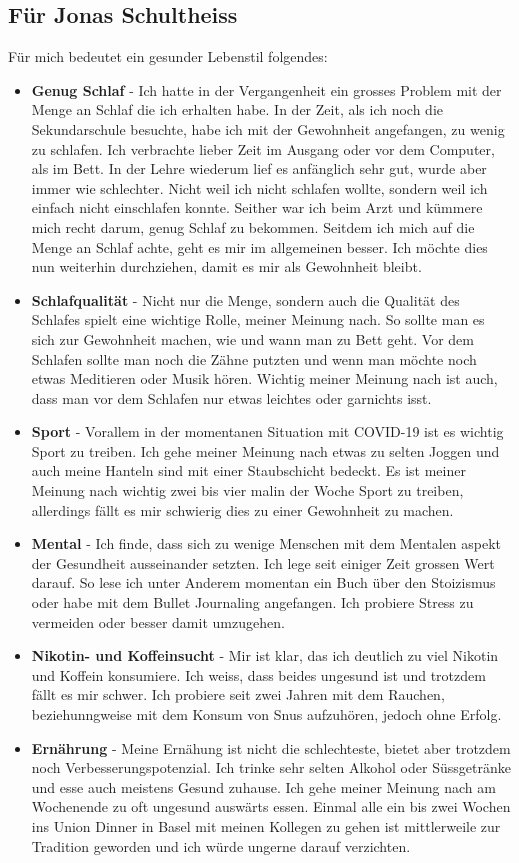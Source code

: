 \subsection{Für Jonas Schultheiss}
\authortoc{\jonas}{\subsectionident}
Für mich bedeutet ein gesunder Lebenstil folgendes:
\begin{itemize}
  \item \textbf{Genug Schlaf} - Ich hatte in der Vergangenheit ein grosses Problem mit der Menge an Schlaf die ich erhalten habe. In der Zeit, als ich noch die Sekundarschule besuchte, habe ich mit der Gewohnheit angefangen, zu wenig zu schlafen. Ich verbrachte lieber Zeit im Ausgang oder vor dem Computer, als im Bett. In der Lehre wiederum lief es anfänglich sehr gut, wurde aber immer wie schlechter. Nicht weil ich nicht schlafen wollte, sondern weil ich einfach nicht einschlafen konnte. Seither war ich beim Arzt und kümmere mich recht darum, genug Schlaf zu bekommen.
  \newline
  Seitdem ich mich auf die Menge an Schlaf achte, geht es mir im allgemeinen besser. Ich möchte dies nun weiterhin durchziehen, damit es mir als Gewohnheit bleibt.
  \item \textbf{Schlafqualität} - Nicht nur die Menge, sondern auch die Qualität des Schlafes spielt eine wichtige Rolle, meiner Meinung nach. So sollte man es sich zur Gewohnheit machen, wie und wann man zu Bett geht. Vor dem Schlafen sollte man noch die Zähne putzten und wenn man möchte noch etwas Meditieren oder Musik hören. Wichtig meiner Meinung nach ist auch, dass man vor dem Schlafen nur etwas leichtes oder garnichts isst.
  \item \textbf{Sport} - Vorallem in der momentanen Situation mit COVID-19 ist es wichtig Sport zu treiben. Ich gehe meiner Meinung nach etwas zu selten Joggen und auch meine Hanteln sind mit einer Staubschicht bedeckt. Es ist meiner Meinung nach wichtig zwei bis vier malin der Woche Sport zu treiben, allerdings fällt es mir schwierig dies zu einer Gewohnheit zu machen.
  \item \textbf{Mental} - Ich finde, dass sich zu wenige Menschen mit dem Mentalen aspekt der Gesundheit ausseinander setzten. Ich lege seit einiger Zeit grossen Wert darauf. So lese ich unter Anderem momentan ein Buch über den Stoizismus oder habe mit dem Bullet Journaling angefangen. Ich probiere Stress zu vermeiden oder besser damit umzugehen.
  \item \textbf{Nikotin- und Koffeinsucht} - Mir ist klar, das ich deutlich zu viel Nikotin und Koffein konsumiere. Ich weiss, dass beides ungesund ist und trotzdem fällt es mir schwer. Ich probiere seit zwei Jahren mit dem Rauchen, beziehunngweise mit dem Konsum von Snus aufzuhören, jedoch ohne Erfolg.
  \item \textbf{Ernährung} - Meine Ernähung ist nicht die schlechteste, bietet aber trotzdem noch Verbesserungspotenzial. Ich trinke sehr selten Alkohol oder Süssgetränke und esse auch meistens Gesund zuhause. Ich gehe meiner Meinung nach am Wochenende zu oft ungesund auswärts essen. Einmal alle ein bis zwei Wochen ins Union Dinner in Basel mit meinen Kollegen zu gehen ist mittlerweile zur Tradition geworden und ich würde ungerne darauf verzichten.
\end{itemize}